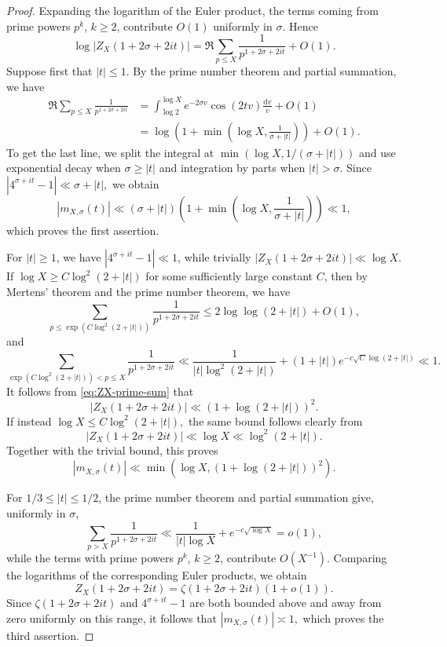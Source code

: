 \documentclass[a4paper,12pt,reqno]{amsart}
\numberwithin{equation}{section}
\theoremstyle{remark}
\begin{document}
\begin{proof}
Expanding the logarithm of the Euler product, the terms coming from
prime powers $p^k$, $k\geq2$, contribute $O(1)$ uniformly in $\sigma$.
Hence
\begin{equation}\label{eq:ZX-prime-sum}
 \log |Z_X(1+2\sigma+2it)|
 =
 \Re\sum_{p\leq X}\frac{1}{p^{1+2\sigma+2it}}+O(1).
\end{equation}
Suppose first that $|t|\leq1$. By the prime number theorem and partial summation, we have
\[
\begin{aligned}
 \Re\sum_{p\leq X}\frac1{p^{1+2\sigma+2it}}
 &=
 \int_{\log 2}^{\log X}
 e^{-2\sigma v}\cos(2tv)\frac{\mathrm{d}v}{v}
 +O(1)\\
 &=
 \log\left(
 1+\min\left(\log X,\frac{1}{\sigma+|t|}\right)
 \right)+O(1).
 \end{aligned}
\]
To get the last line, we split the integral at \( \min\left(\log X,1/{(\sigma+|t|)}\right)
\)
and use exponential decay when $\sigma\geq|t|$ and integration by
parts when $|t|>\sigma$.
Since
\( |4^{\sigma+it}-1|\ll\sigma+|t|,
\)
we obtain
\[
 |m_{X,\sigma}(t)|
 \ll
 (\sigma+|t|)
 \left(
 1+\min\left(\log X,\frac{1}{\sigma+|t|}\right)
 \right)
 \ll1,
\]
which proves the first assertion.

For $|t|\geq1$, we have $|4^{\sigma+it}-1|\ll1$, while trivially
\(
 |Z_X(1+2\sigma+2it)|\ll\log X.
\)
If
\(
 \log X\ge C\log^2(2+|t|)
\) for some sufficiently large constant $C$,
 then by Mertens'
theorem and the prime number theorem, we have
\[
 \sum_{p\leq \exp(C\log^2(2+|t|))}\frac1{p^{1+2\sigma+2it}}
 \le 2\log\log(2+|t|)+O(1),
\]
and
\[
 \sum_{\exp(C\log^2(2+|t|))<p\leq X}
 \frac1{p^{1+2\sigma+2it}}
 \ll
 \frac1{|t|\log^2(2+|t|)}
 +(1+|t|)e^{-c\sqrt C\log(2+|t|)}
 \ll1.
\]
It follows from \eqref{eq:ZX-prime-sum} that
\[
 |Z_X(1+2\sigma+2it)|
 \ll(1+\log(2+|t|))^2.
\]
If instead \( \log X\le C\log^2(2+|t|),
\)
the same bound follows clearly from
\[
 |Z_X(1+2\sigma+2it)|
 \ll\log X\ll\log^2(2+|t|).
\]
Together with the trivial bound, this proves
\[
 |m_{X,\sigma}(t)|
 \ll
 \min\left(\log X,(1+\log(2+|t|))^2\right).
\]

For $1/3\leq|t|\leq1/2$, the prime number theorem and partial summation
give, uniformly in $\sigma$, 
\[ \sum_{p>X}\frac1{p^{1+2\sigma+2it}}\ll \frac{1}{|t|\log X}+e^{-c\sqrt{\log X}} =o(1),
\]
while the terms with prime powers $p^k$, $k\geq2$, contribute
$O(X^{-1})$.  Comparing the logarithms of the corresponding Euler
products, we obtain
\[
 Z_X(1+2\sigma+2it)
 =
 \zeta(1+2\sigma+2it)(1+o(1)).
\]
Since $\zeta(1+2\sigma+2it)$ and $4^{\sigma+it}-1$ are both bounded
above and away from zero uniformly on this range, it follows that
\(
 |m_{X,\sigma}(t)|\asymp1,
\) which proves the third assertion.
\end{proof}
\end{document}
